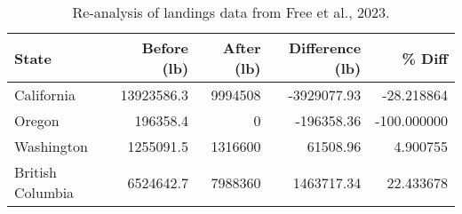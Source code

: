 \begin{table}

\caption{\label{tab:free_effects}Re-analysis of landings data from Free et al., 2023.}
\centering
\begin{tabular}[t]{lrrrr}
\toprule
State & Before (lb) & After (lb) & Difference (lb) & \% Diff\\
\midrule
California & 13923586.3 & 9994508 & -3929077.93 & -28.218864\\
Oregon & 196358.4 & 0 & -196358.36 & -100.000000\\
Washington & 1255091.5 & 1316600 & 61508.96 & 4.900755\\
British Columbia & 6524642.7 & 7988360 & 1463717.34 & 22.433678\\
\bottomrule
\end{tabular}
\end{table}